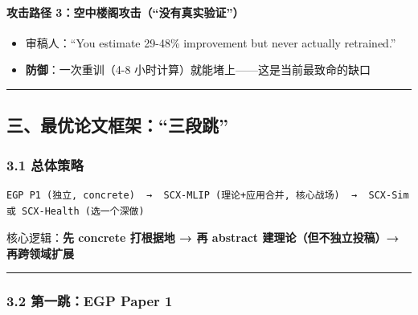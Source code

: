 \documentclass[
  12pt,
]{ctexart}
\providecommand{\tightlist}{%
  \setlength{\itemsep}{0pt}\setlength{\parskip}{0pt}}
\begin{document}
\paragraph{攻击路径
3：空中楼阁攻击（``没有真实验证''）}\label{ux653bux51fbux8defux5f84-3ux7a7aux4e2dux697cux9601ux653bux51fbux6ca1ux6709ux771fux5b9eux9a8cux8bc1}

\begin{itemize}
\tightlist
\item
  审稿人：``You estimate 29-48\% improvement but never actually
  retrained.''
\item
  \textbf{防御}：一次重训（4-8
  小时计算）就能堵上------这是当前最致命的缺口
\end{itemize}

\begin{center}\rule{0.5\linewidth}{0.5pt}\end{center}

\subsection{三、最优论文框架：``三段跳''}\label{ux4e09ux6700ux4f18ux8bbaux6587ux6846ux67b6ux4e09ux6bb5ux8df3}

\subsubsection{3.1 总体策略}\label{ux603bux4f53ux7b56ux7565}

\begin{verbatim}
EGP P1 (独立, concrete)  →  SCX-MLIP (理论+应用合并, 核心战场)  →  SCX-Sim 或 SCX-Health (选一个深做)
\end{verbatim}

核心逻辑：\textbf{先 concrete 打根据地 → 再 abstract
建理论（但不独立投稿）→ 再跨领域扩展}

\begin{center}\rule{0.5\linewidth}{0.5pt}\end{center}

\subsubsection{3.2 第一跳：EGP Paper
1}\label{ux7b2cux4e00ux8df3egp-paper-1}
\end{document}
